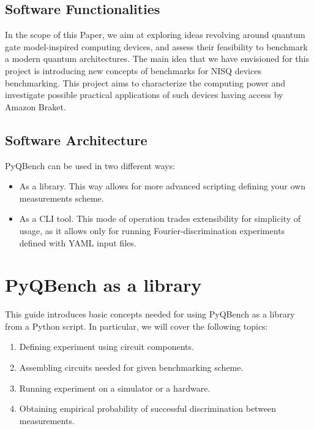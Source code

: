 \documentclass[preprint,12pt, a4paper, dvipsnames]{elsarticle}
\newcommand{\1}{{\rm 1\hspace{-0.9mm}l}}
\begin{document}
\subsection{Software Functionalities}\label{sec:sortware-functionalities}


In the scope of this Paper, we aim at  exploring ideas revolving around quantum
gate model-inspired computing devices, and assess their feasibility to
benchmark a modern quantum architectures. The main idea that we have envisioned
for this project is  introducing new concepts of benchmarks for NISQ devices
benchmarking. This project aims to characterize the computing power and
investigate possible practical applications of such devices having access by
Amazon Braket.



\subsection{Software Architecture}\label{sec:sortware-architecture}
PyQBench can be used in two different ways:
\begin{itemize}
\item As a library. This way allows for more advanced scripting defining your own measurements scheme.

\item As a CLI tool. This mode of operation trades extensibility for simplicity of usage, as it allows only for running Fourier-discrimination experiments defined with  YAML input files.
\end{itemize}


\section{PyQBench as a library}\label{sec:pyqbench-as-library}
This guide introduces basic concepts needed for using PyQBench as a library from a Python script. In particular, we will cover the following topics:
\begin{enumerate}
\item Defining experiment using circuit components.
\item Assembling circuits needed for given benchmarking scheme.
\item Running experiment on a simulator or a hardware.
\item Obtaining empirical probability of successful discrimination between measurements.
\end{enumerate}
\end{document}
